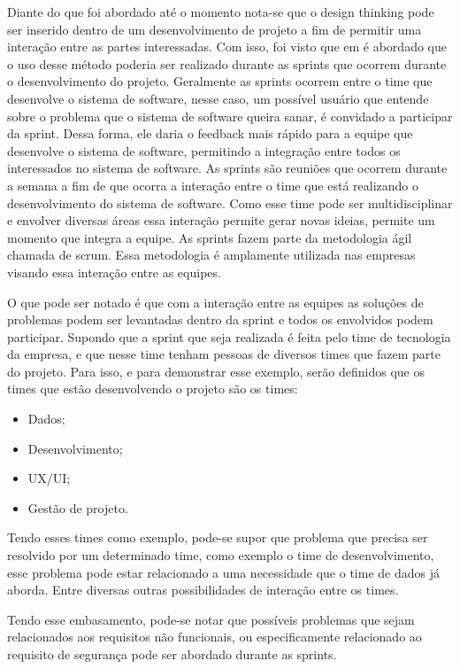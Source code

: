 \documentclass[a4paper,twoside]{article}
\begin{document}
Diante do que foi abordado até o momento nota-se que o design thinking pode ser inserido dentro de um desenvolvimento de projeto a fim de permitir uma interação entre as partes interessadas. Com isso, foi visto que em \cite{DBLP:journals/information/MartinsJCKPO19} é abordado que o uso desse método poderia ser realizado durante as sprints que ocorrem durante o desenvolvimento do projeto. Geralmente as sprints ocorrem entre o time que desenvolve o sistema de software, nesse caso, um possível usuário que entende sobre o problema que o sistema de software queira sanar, é convidado a participar da sprint. Dessa forma, ele daria o feedback mais rápido para a equipe que desenvolve o sistema de software, permitindo a integração entre todos os interessados no sistema de software. As sprints são reuniões que ocorrem durante a semana a fim de que ocorra a interação entre o time que está realizando o desenvolvimento do sistema de software. Como esse time pode ser multidisciplinar e envolver diversas áreas essa interação permite gerar novas ideias, permite um momento que integra a equipe. As sprints fazem parte da metodologia ágil chamada de scrum. Essa metodologia é amplamente utilizada nas empresas visando essa interação entre as equipes.

O que pode ser notado é que com a interação entre as equipes as soluções de problemas podem ser levantadas dentro da sprint e todos os envolvidos podem participar. Supondo que a sprint que seja realizada é feita pelo time de tecnologia da empresa, e que nesse time tenham pessoas de diversos times que fazem parte do projeto. Para isso, e para demonstrar esse exemplo, serão definidos que os times que estão desenvolvendo o projeto são os times:

\begin{itemize}
    \item Dados;
    \item Desenvolvimento;
    \item UX/UI;
    \item Gestão de projeto.
\end{itemize}

Tendo esses times como exemplo, pode-se supor que  problema que precisa ser resolvido por um determinado time, como exemplo o time de desenvolvimento, esse problema pode estar relacionado a uma necessidade que o time de dados já aborda. Entre diversas outras possibilidades de interação entre os times. 

Tendo esse embasamento, pode-se notar que possíveis problemas que sejam relacionados aos requisitos não funcionais, ou especificamente relacionado ao requisito de segurança pode ser abordado durante as sprints.
\end{document}
